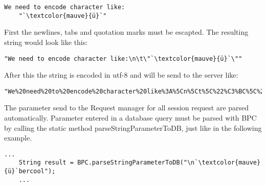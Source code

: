 \documentclass[12pt,a4paper,oneside]{report}
\begin{document}
\begin{lstlisting}[caption=Example string]
We need to encode character like:
	"`\textcolor{mauve}{ü}`"
\end{lstlisting}
\label{ExampleString}

First the newlines, tabs and quotation marks must be escapted. The resulting string would look like this:

\begin{lstlisting}[caption=Escaped character]
"We need to encode character like:\n\t\"`\textcolor{mauve}{ü}`\""
\end{lstlisting}
\label{ExampleStringExcaped}
After this the string is encoded in utf-8 and will be send to the server like:

\begin{lstlisting}[caption=UTF-8 encoded string]
"We%20need%20to%20encode%20character%20like%3A%5Cn%5Ct%5C%22%C3%BC%5C%22"
\end{lstlisting}
\label{ExampleStringUTF8}

The parameter send to the Request manager for all session request are parsed automatically. Parameter entered in a database query must be parsed with BPC by calling the static method parseStringParameterToDB, just like in the following example.
\begin{lstlisting}[caption=Parse a string parameter]
	...
	String result = BPC.parseStringParameterToDB("\n`\textcolor{mauve}{ü}`bercool");
	...
\end{lstlisting}
\label{ParseStringParameter}
\end{document}
